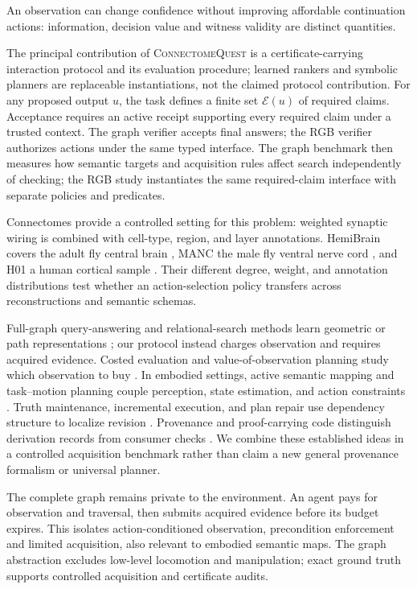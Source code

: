 \documentclass{article}
\begin{document}
An observation can change confidence without improving affordable continuation
actions: information, decision value and witness validity are distinct quantities.

The principal contribution of \textsc{ConnectomeQuest} is a
certificate-carrying interaction protocol and its evaluation procedure; learned
rankers and symbolic planners are replaceable instantiations, not the claimed
protocol contribution. For any proposed output $u$, the task defines a finite
set $\mathcal E(u)$ of required claims. Acceptance requires an active receipt
supporting every required claim under a trusted context. The graph verifier accepts
final answers; the RGB verifier authorizes actions under the same typed interface.
The graph benchmark then
measures how semantic targets and acquisition rules affect search independently
of checking; the RGB study instantiates the same required-claim interface with
separate policies and predicates.

Connectomes provide a controlled setting for this problem: weighted synaptic
wiring is combined with cell-type, region, and layer annotations. HemiBrain covers the adult fly central brain
\citep{scheffer2020hemibrain}, MANC the male fly ventral nerve cord
\citep{takemura2024manc}, and H01 a human cortical sample \citep{shapsoncoe2024h01}.
Their different degree, weight, and annotation distributions test whether an
action-selection policy transfers across reconstructions and semantic schemas.

Full-graph query-answering and relational-search methods learn geometric or
path representations \citep{ren2020query2box,das2018minerva,galkin2024ultraquery};
our protocol instead charges observation and requires acquired evidence.
Costed evaluation and value-of-observation planning study which observation to
buy \citep{deshpande2014sbfe,garnett2012bayesian,liu2025activevoo}. In embodied
settings, active semantic mapping and task--motion planning couple perception,
state estimation, and action constraints
\citep{chaplot2020active,garrett2021integrated}. Truth maintenance, incremental
execution, and plan repair use dependency structure to localize revision
\citep{doyle1979tms,shu2005incremental,conrad2011drake,zaidins2025repair}.
Provenance and proof-carrying code distinguish derivation records from consumer
checks \citep{w3c2013provo,necula1997pcc}. We combine these established ideas in
a controlled acquisition benchmark rather than claim a new general provenance
formalism or universal planner.

The complete graph remains private to the environment. An agent pays for
observation and traversal, then submits acquired evidence before its budget
expires. This isolates action-conditioned observation, precondition enforcement
and limited acquisition, also relevant to embodied semantic maps. The graph
abstraction excludes low-level locomotion and manipulation; exact ground truth
supports controlled acquisition and certificate audits.
\end{document}

